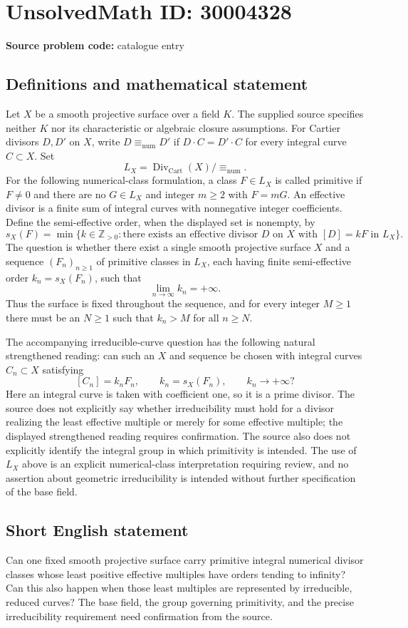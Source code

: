\documentclass[11pt]{article}
\newcommand{\Z}{\mathbb{Z}}
\begin{document}
\section*{UnsolvedMath ID: 30004328}
\textbf{Source problem code:} catalogue entry
\subsection{Definitions and mathematical statement}
Let \(X\) be a smooth projective surface over a field \(K\). The supplied source specifies neither \(K\) nor its characteristic or algebraic closure assumptions. For Cartier divisors \(D,D'\) on \(X\), write \(D\equiv_{\mathrm{num}}D'\) if \(D\cdot C=D'\cdot C\) for every integral curve \(C\subset X\). Set
\[
L_X=\operatorname{Div}_{\mathrm{Cart}}(X)/\!\equiv_{\mathrm{num}}.
\]
For the following numerical-class formulation, a class \(F\in L_X\) is called primitive if \(F\ne0\) and there are no \(G\in L_X\) and integer \(m\ge2\) with \(F=mG\). An effective divisor is a finite sum of integral curves with nonnegative integer coefficients. Define the semi-effective order, when the displayed set is nonempty, by
\[
s_X(F)=\min\bigl\{k\in\Z_{>0}:\text{there exists an effective divisor }D\text{ on }X\text{ with }[D]=kF\text{ in }L_X\bigr\}.
\]
The question is whether there exist a single smooth projective surface \(X\) and a sequence \((F_n)_{n\ge1}\) of primitive classes in \(L_X\), each having finite semi-effective order \(k_n=s_X(F_n)\), such that
\[
\lim_{n\to\infty}k_n=+\infty.
\]
Thus the surface is fixed throughout the sequence, and for every integer \(M\ge1\) there must be an \(N\ge1\) such that \(k_n>M\) for all \(n\ge N\).

The accompanying irreducible-curve question has the following natural strengthened reading: can such an \(X\) and sequence be chosen with integral curves \(C_n\subset X\) satisfying
\[
[C_n]=k_nF_n,\qquad k_n=s_X(F_n),\qquad k_n\longrightarrow+\infty?
\]
Here an integral curve is taken with coefficient one, so it is a prime divisor. The source does not explicitly say whether irreducibility must hold for a divisor realizing the least effective multiple or merely for some effective multiple; the displayed strengthened reading requires confirmation. The source also does not explicitly identify the integral group in which primitivity is intended. The use of \(L_X\) above is an explicit numerical-class interpretation requiring review, and no assertion about geometric irreducibility is intended without further specification of the base field.
\subsection{Short English statement}
Can one fixed smooth projective surface carry primitive integral numerical divisor classes whose least positive effective multiples have orders tending to infinity? Can this also happen when those least multiples are represented by irreducible, reduced curves? The base field, the group governing primitivity, and the precise irreducibility requirement need confirmation from the source.
\end{document}

